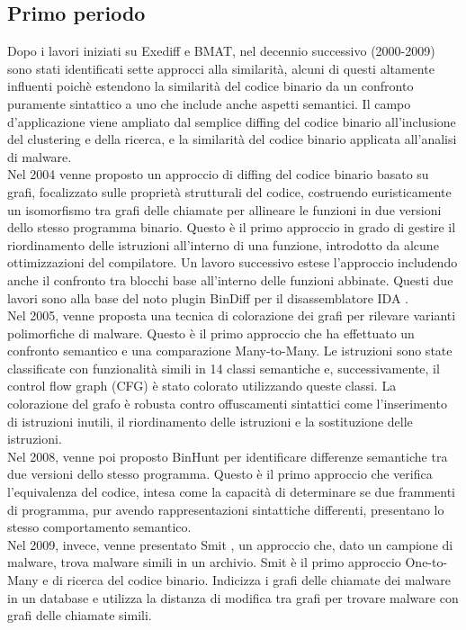 \documentclass[12pt,a4paper,openright,twoside]{report}
\begin{document}
\subsection{Primo periodo}

Dopo i lavori iniziati su Exediff e BMAT, nel decennio successivo (2000-2009) sono stati identificati sette approcci alla similarità, alcuni di questi altamente influenti poichè estendono la similarità del codice binario da un confronto puramente sintattico a uno che include anche aspetti semantici. Il campo d'applicazione viene ampliato dal semplice diffing del codice binario all'inclusione del clustering e della ricerca, e la similarità del codice binario applicata all'analisi di malware.\\
Nel 2004 venne proposto un approccio di diffing del codice binario basato su grafi, focalizzato sulle proprietà strutturali del codice, costruendo euristicamente un isomorfismo tra grafi delle chiamate per allineare le funzioni in due versioni dello stesso programma binario. Questo è il primo approccio in grado di gestire il riordinamento delle istruzioni all'interno di una funzione, introdotto da alcune ottimizzazioni del compilatore. Un lavoro successivo estese l’approccio includendo anche il confronto tra blocchi base all’interno delle funzioni abbinate. Questi due lavori sono alla base del noto plugin BinDiff \cite{bindiff} per il disassemblatore IDA \cite{idapro}.\\
Nel 2005, venne proposta una tecnica di colorazione dei grafi \cite{kruegel2005} per rilevare varianti polimorfiche di malware. Questo è il primo approccio che ha effettuato un confronto semantico e una comparazione Many-to-Many. Le istruzioni sono state classificate con funzionalità simili in 14 classi semantiche e, successivamente, il control flow graph (CFG) è stato colorato utilizzando queste classi. La colorazione del grafo è robusta contro offuscamenti sintattici come l’inserimento di istruzioni inutili, il riordinamento delle istruzioni e la sostituzione delle istruzioni.\\
Nel 2008, venne poi proposto BinHunt \cite{gao2008} per identificare differenze semantiche tra due versioni dello stesso programma. Questo è il primo approccio che verifica l’equivalenza del codice, intesa come la capacità di determinare se due frammenti di programma, pur avendo rappresentazioni sintattiche differenti, presentano lo stesso comportamento semantico. \\
Nel 2009, invece, venne presentato Smit \cite{Smit}, un approccio che, dato un campione di malware, trova malware simili in un archivio. Smit è il primo approccio One-to-Many e di ricerca del codice binario. Indicizza i grafi delle chiamate dei malware in un database e utilizza la distanza di modifica tra grafi per trovare malware con grafi delle chiamate simili.
\end{document}
